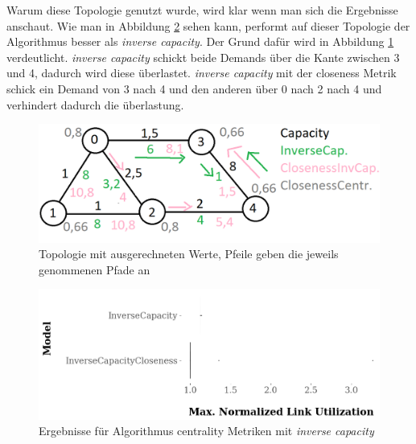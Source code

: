 \documentclass[sigconf, nonacm, review]{acmart}
\begin{document}
Warum diese Topologie genutzt wurde, wird klar wenn man sich die Ergebnisse anschaut.
Wie man in Abbildung \ref{fig:kai_p2_results} sehen kann, performt auf dieser Topologie der Algorithmus besser als \emph{inverse capacity}.
Der Grund daf\"ur wird in Abbildung \ref{fig:kai_p2_AdTopo} verdeutlicht.
\emph{inverse capacity} schickt beide Demands \"uber die Kante zwischen 3 und 4, dadurch wird diese \"uberlastet.
\emph{inverse capacity} mit der closeness Metrik schick ein Demand von 3 nach 4 und den anderen \"uber 0 nach 2 nach 4 und verhindert dadurch die \"uberlastung.
\begin{figure}
\centering
\includegraphics[width=\linewidth]{figures/kai_p2_TopoAd.png}
\caption{Topologie mit ausgerechneten Werte, Pfeile geben die jeweils genommenen Pfade an}
\label{fig:kai_p2_AdTopo}
\end{figure}
\begin{figure}
\centering
\includegraphics[width=\linewidth]{figures/kai_p2_results.png}
\caption{Ergebnisse f\"ur Algorithmus centrality Metriken mit \emph{inverse capacity}}
\label{fig:kai_p2_results}
\end{figure}
\end{document}
